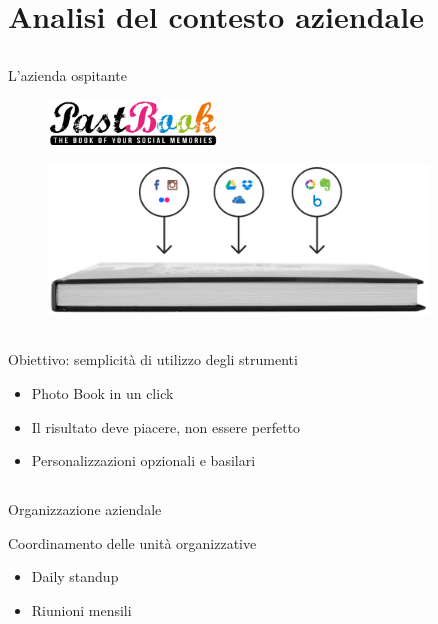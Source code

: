 \section{Analisi del contesto aziendale}
	\subsection{}
		\begin{frame}{L'azienda ospitante}
			\begin{figure}[H]
				\centering
				\includegraphics[width=0.4\textwidth]{capitolo_1/immagini/logo_pastbook.png}
			\end{figure}
			\begin{figure}[H]
				\centering
				\includegraphics[width=0.9\textwidth]{capitolo_1/immagini/photo_book_one_click.png}
			\end{figure}
		\end{frame}
	\subsection{}
		\begin{frame}{Obiettivo: semplicità di utilizzo degli strumenti}
			\begin{itemize}
				\item Photo Book in un click
				\item Il risultato deve piacere, non essere perfetto
				\item Personalizzazioni opzionali e basilari
			\end{itemize}
			
		\end{frame}
	\subsection{}
		\begin{frame}{Organizzazione aziendale}
			
			\begin{block}{Coordinamento delle unità organizzative}
				\begin{itemize}
					\item Daily standup
					\item Riunioni mensili
				\end{itemize}
			\end{block}
		\end{frame}
